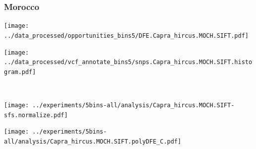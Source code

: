 \subsubsection{Morocco}

\begin{minipage}{0.49\linewidth}
    \texttt{[image: ../data\_processed/opportunities\_bins5/DFE.Capra\_hircus.MOCH.SIFT.pdf]}
\end{minipage}
\begin{minipage}{0.49\linewidth}
    \texttt{[image: ../data\_processed/vcf\_annotate\_bins5/snps.Capra\_hircus.MOCH.SIFT.histogram.pdf]}
\end{minipage}
\\
\begin{minipage}{0.49\linewidth}
    \texttt{[image: ../experiments/5bins-all/analysis/Capra\_hircus.MOCH.SIFT-sfs.normalize.pdf]}
\end{minipage}
\begin{minipage}{0.4\linewidth}
    \texttt{[image: ../experiments/5bins-all/analysis/Capra\_hircus.MOCH.SIFT.polyDFE\_C.pdf]}
\end{minipage}
